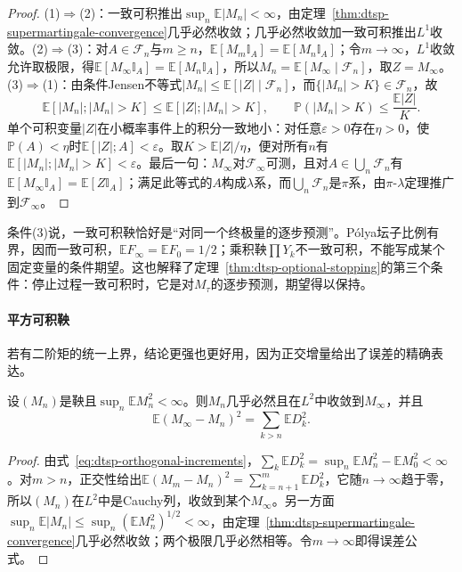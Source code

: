 \begin{proof}
(1)$\Rightarrow$(2)：一致可积推出$\sup_n\mathbb E|M_n|<\infty$，由定理~\ref{thm:dtsp-supermartingale-convergence}几乎必然收敛；几乎必然收敛加一致可积推出$L^1$收敛。(2)$\Rightarrow$(3)：对$A\in\mathcal F_n$与$m\geq n$，$\mathbb E[M_m\mathbb I_A]=\mathbb E[M_n\mathbb I_A]$；令$m\to\infty$，$L^1$收敛允许取极限，得$\mathbb E[M_\infty\mathbb I_A]=\mathbb E[M_n\mathbb I_A]$，所以$M_n=\mathbb E[M_\infty\mid\mathcal F_n]$，取$Z=M_\infty$。(3)$\Rightarrow$(1)：由条件Jensen不等式$|M_n|\leq\mathbb E[|Z|\mid\mathcal F_n]$，而$\{|M_n|>K\}\in\mathcal F_n$，故
\[
  \mathbb E[|M_n|;|M_n|>K]\leq\mathbb E[|Z|;|M_n|>K],\qquad\mathbb P(|M_n|>K)\leq\frac{\mathbb E|Z|}{K}.
\]
单个可积变量$|Z|$在小概率事件上的积分一致地小：对任意$\varepsilon>0$存在$\eta>0$，使$\mathbb P(A)<\eta$时$\mathbb E[|Z|;A]<\varepsilon$。取$K>\mathbb E|Z|/\eta$，便对所有$n$有$\mathbb E[|M_n|;|M_n|>K]<\varepsilon$。最后一句：$M_\infty$对$\mathcal F_\infty$可测，且对$A\in\bigcup_n\mathcal F_n$有$\mathbb E[M_\infty\mathbb I_A]=\mathbb E[Z\mathbb I_A]$；满足此等式的$A$构成$\lambda$系，而$\bigcup_n\mathcal F_n$是$\pi$系，由$\pi$-$\lambda$定理推广到$\mathcal F_\infty$。
\end{proof}

条件(3)说，一致可积鞅恰好是“对同一个终极量的逐步预测”。Pólya坛子比例有界，因而一致可积，$\mathbb EF_\infty=\mathbb EF_0=1/2$；乘积鞅$\prod Y_k$不一致可积，不能写成某个固定变量的条件期望。这也解释了定理~\ref{thm:dtsp-optional-stopping}的第三个条件：停止过程一致可积时，它是对$M_\tau$的逐步预测，期望得以保持。

\paragraph{平方可积鞅}
若有二阶矩的统一上界，结论更强也更好用，因为正交增量给出了误差的精确表达。

\begin{theorem}[$L^2$鞅收敛]
  \label{thm:dtsp-l2-martingale}
  设$(M_n)$是鞅且$\sup_n\mathbb EM_n^2<\infty$。则$M_n$几乎必然且在$L^2$中收敛到$M_\infty$，并且
  \[
    \mathbb E(M_\infty-M_n)^2=\sum_{k>n}\mathbb ED_k^2.
  \]
\end{theorem}

\begin{proof}
由式~\eqref{eq:dtsp-orthogonal-increments}，$\sum_k\mathbb ED_k^2=\sup_n\mathbb EM_n^2-\mathbb EM_0^2<\infty$。对$m>n$，正交性给出$\mathbb E(M_m-M_n)^2=\sum_{k=n+1}^m\mathbb ED_k^2$，它随$n\to\infty$趋于零，所以$(M_n)$在$L^2$中是Cauchy列，收敛到某个$M_\infty$。另一方面$\sup_n\mathbb E|M_n|\leq\sup_n(\mathbb EM_n^2)^{1/2}<\infty$，由定理~\ref{thm:dtsp-supermartingale-convergence}几乎必然收敛；两个极限几乎必然相等。令$m\to\infty$即得误差公式。
\end{proof}

